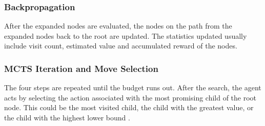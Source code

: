 
\subsubsection{Backpropagation}
After the expanded nodes are evaluated, the nodes on the path from the expanded nodes back to the root are updated.
The statistics updated usually include visit count, estimated value and accumulated reward of the nodes.

\subsubsection{MCTS Iteration and Move Selection}
The four steps are repeated until the budget runs out.
After the search, the agent acts by selecting the action associated with the most promising child of the root node.
This could be the most visited child, the child with the greatest value, or the child with the highest lower bound \cite{FreshMaxLcb_RoyJonathan_2019}.


